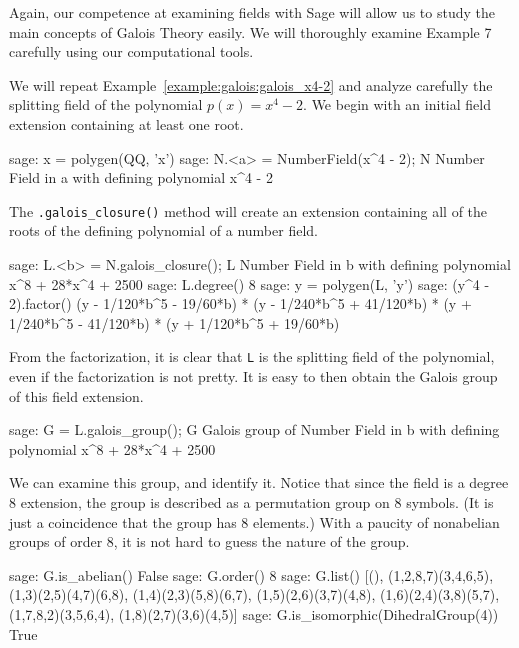 Again, our competence at examining fields with Sage will allow us to study the main concepts of Galois Theory easily.  We will thoroughly examine Example 7 carefully using our computational tools.\par
%
%
We will repeat Example~\ref{example:galois:galois_x4-2} and analyze carefully the splitting field of the polynomial $p(x)=x^4-2$.  We begin with an initial field extension containing at least one root.
%
\begin{sageexample}
sage: x = polygen(QQ, 'x')
sage: N.<a> = NumberField(x^4 - 2); N
Number Field in a with defining polynomial x^4 - 2
\end{sageexample}
%
The \verb?.galois_closure()? method will create an extension containing all of the roots of the defining polynomial of a number field.
%
\begin{sageexample}
sage: L.<b> = N.galois_closure(); L
Number Field in b with defining polynomial x^8 + 28*x^4 + 2500
sage: L.degree()
8
sage: y = polygen(L, 'y')
sage: (y^4 - 2).factor()
(y - 1/120*b^5 -  19/60*b) *
(y - 1/240*b^5 + 41/120*b) *
(y + 1/240*b^5 - 41/120*b) *
(y + 1/120*b^5 +  19/60*b)
\end{sageexample}
%
From the factorization, it is clear that \verb?L? is the splitting field of the polynomial, even if the factorization is not pretty.  It is easy to then obtain the Galois group of this field extension.
%
\begin{sageexample}
sage: G = L.galois_group(); G
Galois group of Number Field in b with
defining polynomial x^8 + 28*x^4 + 2500
\end{sageexample}
%
We can examine this group, and identify it.  Notice that since the field is a degree 8 extension, the group is described as a permutation group on 8 symbols.  (It is just a coincidence that the group has 8 elements.)  With a paucity of nonabelian groups of order 8, it is not hard to guess the nature of the group.
%
\begin{sageexample}
sage: G.is_abelian()
False
sage: G.order()
8
sage: G.list()
[(), (1,2,8,7)(3,4,6,5),
(1,3)(2,5)(4,7)(6,8), (1,4)(2,3)(5,8)(6,7),
(1,5)(2,6)(3,7)(4,8), (1,6)(2,4)(3,8)(5,7),
(1,7,8,2)(3,5,6,4), (1,8)(2,7)(3,6)(4,5)]
sage: G.is_isomorphic(DihedralGroup(4))
True
\end{sageexample}
